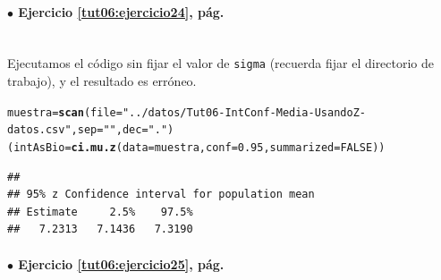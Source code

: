 \documentclass[10pt,a4paper]{article}\usepackage[]{graphicx}\usepackage[]{color}
\makeatletter
\newcommand{\hlnum}[1]{\textcolor[rgb]{0.686,0.059,0.569}{#1}}%
\newcommand{\hlstr}[1]{\textcolor[rgb]{0.192,0.494,0.8}{#1}}%
\newcommand{\hlstd}[1]{\textcolor[rgb]{0.345,0.345,0.345}{#1}}%
\newcommand{\hlkwb}[1]{\textcolor[rgb]{0.69,0.353,0.396}{#1}}%
\newcommand{\hlkwc}[1]{\textcolor[rgb]{0.333,0.667,0.333}{#1}}%
\newcommand{\hlkwd}[1]{\textcolor[rgb]{0.737,0.353,0.396}{\textbf{#1}}}%
\newenvironment{kframe}{%
 \def\at@end@of@kframe{}%
 \ifinner\ifhmode%
  \def\at@end@of@kframe{\end{minipage}}%
  \begin{minipage}{\columnwidth}%
 \fi\fi%
 \def\FrameCommand##1{\hskip\@totalleftmargin \hskip-\fboxsep
 \colorbox{shadecolor}{##1}\hskip-\fboxsep
     \hskip-\linewidth \hskip-\@totalleftmargin \hskip\columnwidth}%
 \MakeFramed {\advance\hsize-\width
   \@totalleftmargin\z@ \linewidth\hsize
   \@setminipage}}%
 {\par\unskip\endMakeFramed%
 \at@end@of@kframe}
\newenvironment{knitrout}{}{} %
\makeatother
\begin{document}
\paragraph{\bf $\bullet$ Ejercicio \ref{tut06:ejercicio24}, pág. \pageref{tut06:ejercicio24}}
\label{tut06:ejercicio24:sol}\quad\\
Ejecutamos el código sin fijar el valor de {\tt sigma} (recuerda fijar el directorio de trabajo), y el resultado es erróneo.
\begin{knitrout}
\color{fgcolor}\begin{kframe}
\begin{alltt}
\hlstd{muestra} \hlkwb{=} \hlkwd{scan}\hlstd{(}\hlkwc{file}\hlstd{=}\hlstr{"../datos/Tut06-IntConf-Media-UsandoZ-datos.csv"}\hlstd{,} \hlkwc{sep}\hlstd{=}\hlstr{" "}\hlstd{,} \hlkwc{dec}\hlstd{=}\hlstr{"."}\hlstd{)}
\hlstd{(intAsBio} \hlkwb{=} \hlkwd{ci.mu.z}\hlstd{(}\hlkwc{data}\hlstd{=muestra,} \hlkwc{conf}\hlstd{=}\hlnum{0.95}\hlstd{,} \hlkwc{summarized}\hlstd{=}\hlnum{FALSE}\hlstd{))}
\end{alltt}
\begin{verbatim}
## 
## 95% z Confidence interval for population mean 
## Estimate     2.5%    97.5% 
##   7.2313   7.1436   7.3190
\end{verbatim}
\end{kframe}
\end{knitrout}


\paragraph{\bf $\bullet$ Ejercicio \ref{tut06:ejercicio25}, pág. \pageref{tut06:ejercicio25}}
\label{tut06:ejercicio25:sol}\quad\\
\end{document}
